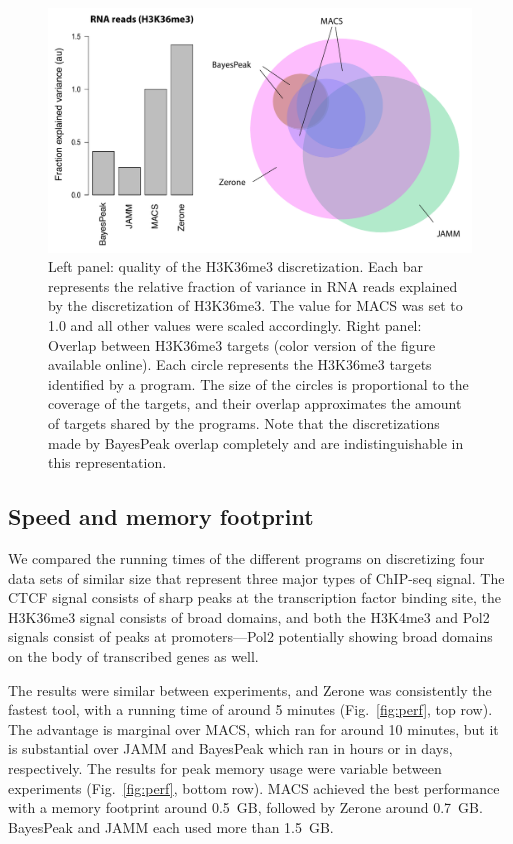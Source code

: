 \documentclass{bioinfo}
\begin{document}
\begin{figure}[!tpb]
\centerline{\includegraphics[scale=0.4]{histone_venn_color_names.pdf}}
\caption{
  Left panel: quality of the H3K36me3 discretization. Each bar
  represents the relative fraction of variance in RNA reads
  explained by the discretization of H3K36me3. The value for MACS was
  set to 1.0 and all other values were scaled accordingly. Right
  panel: Overlap between H3K36me3 targets (color version of the figure
  available online). Each circle represents the
  H3K36me3 targets identified by a program. The size of the circles
  is proportional to the coverage of the targets, and their overlap
  approximates the amount of targets shared by the programs. Note
  that the discretizations made by BayesPeak overlap completely and
  are indistinguishable in this representation.
}\label{fig:venn}
\end{figure}

\subsection{Speed and memory footprint}
We compared the running times of the different programs on discretizing
four data sets of similar size that represent three major types of
ChIP-seq signal. The CTCF signal consists of sharp
peaks at the transcription factor binding site, the H3K36me3 signal
consists of broad domains, and both the H3K4me3 and Pol2 signals consist
of peaks at promoters---Pol2 potentially showing broad domains on the
body of transcribed genes as well.

The results were similar between experiments, and Zerone was
consistently the fastest tool, with a running time of around 5 minutes
(Fig.~\ref{fig:perf}, top row). The advantage is marginal over
MACS, which ran for around 10 minutes, but it is substantial over
JAMM and BayesPeak which ran in hours or in days, respectively.
The results for peak memory usage were variable between experiments
(Fig.~\ref{fig:perf},
bottom row). MACS achieved the best performance with a memory
footprint around 0.5~GB, followed by Zerone around 0.7~GB.
BayesPeak and JAMM each used more than 1.5~GB.
\end{document}
